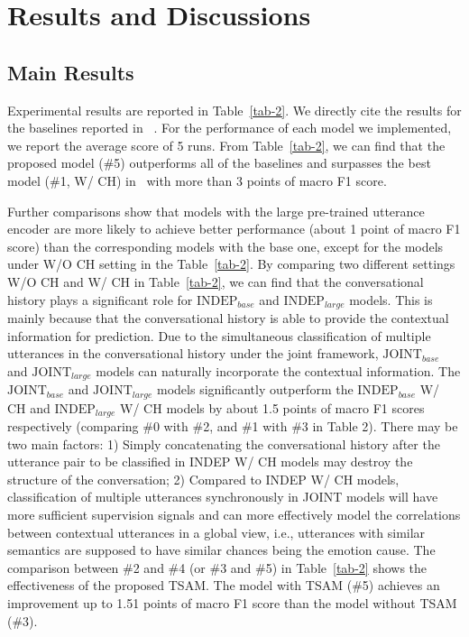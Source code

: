 \documentclass[11pt]{article}
\begin{document}
\section{Results and Discussions}

\subsection{Main Results}
Experimental results are reported in Table~\ref{tab-2}. We directly cite the results for the baselines reported in ~\citep{poria2021recognizing}. For the performance of each model we implemented, we report the average score of 5 runs. From Table~\ref{tab-2}, we can find that the proposed model (\#5) outperforms all of the baselines and surpasses the best model (\#1, W/ CH) in~\citep{poria2021recognizing} with more than 3 points of macro F1 score. 

 
Further comparisons show that models with the large pre-trained utterance encoder are more likely to achieve better performance (about 1 point of macro F1 score) than the corresponding models with the base one, except for the models under W/O CH setting in the Table~\ref{tab-2}. 
By comparing two different settings W/O CH and W/ CH in Table~\ref{tab-2}, we can find that the conversational history plays a significant role for $\text{INDEP}_{base}$ and $\text{INDEP}_{large}$ models. This is mainly because that the conversational history is able to provide the contextual information for prediction. 
Due to the simultaneous classification of multiple utterances in the conversational history under the joint framework, $\text{JOINT}_{base}$ and $\text{JOINT}_{large}$ models can naturally incorporate the contextual information. 
The $\text{JOINT}_{base}$ and $\text{JOINT}_{large}$ models significantly outperform the $\text{INDEP}_{base}$ W/ CH and $\text{INDEP}_{large}$ W/ CH models by about 1.5 points of macro F1 scores respectively (comparing \#0 with \#2, and \#1 with \#3 in Table 2). There may be two main factors: 1) Simply concatenating the conversational history after the utterance pair to be classified in INDEP W/ CH models may destroy the structure of the conversation; 2) Compared to INDEP W/ CH models, classification of multiple utterances synchronously in JOINT models will have more sufficient supervision signals and can more effectively model the correlations between contextual utterances in a global view, i.e., utterances with similar semantics are supposed to have similar chances being the emotion cause.
The comparison between \#2 and \#4 (or \#3 and \#5) in Table~\ref{tab-2} shows the effectiveness of the proposed TSAM. The model with TSAM (\#5) achieves an improvement up to 1.51 points of macro F1 score than the model without TSAM (\#3).     
\end{document}
